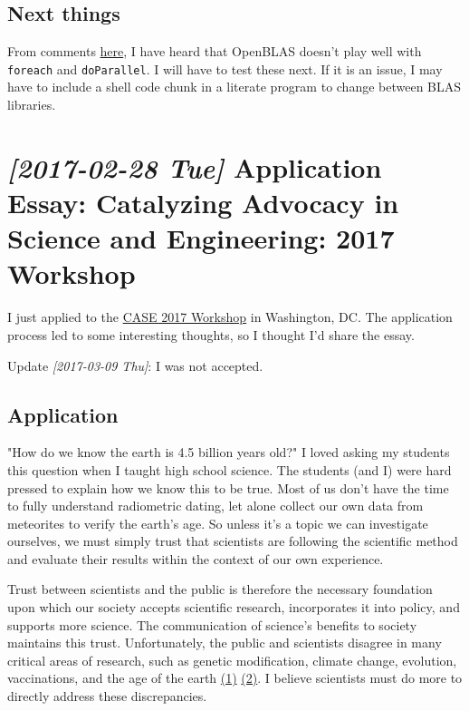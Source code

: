 \documentclass{article}
\begin{document}
\subsection*{Next things}
\label{sec:org8dfe5ce}
From comments \href{http://edustatistics.org/nathanvan/2013/07/09/for-faster-r-use-openblas-instead-better-than-atlas-trivial-to-switch-to-on-ubuntu/}{here}, I have heard that OpenBLAS doesn't play well with
\texttt{foreach} and \texttt{doParallel}.  I will have to test these next.  If it is
an issue, I may have to include a shell code chunk in a literate program
to change between BLAS libraries.

\section*{\textit{[2017-02-28 Tue] } Application Essay: Catalyzing Advocacy in Science and Engineering: 2017 Workshop}
\label{sec:org54913ce}
I just applied to the \href{https://www.aaas.org/page/about-0}{CASE 2017 Workshop} in Washington, DC.  The
application process led to some interesting thoughts, so I thought I'd
share the essay.

Update \textit{[2017-03-09 Thu]}: I was not accepted.

\subsection*{Application}
\label{sec:orgd7dde50}

"How do we know the earth is 4.5 billion years old?"  I loved asking
my students this question when I taught high school science.  The
students (and I) were hard pressed to explain how we know this to be
true. Most of us don't have the time to fully understand radiometric
dating, let alone collect our own data from meteorites to verify the
earth's age. So unless it's a topic we can investigate ourselves, we
must simply trust that scientists are following the scientific method
and evaluate their results within the context of our own experience.

Trust between scientists and the public is therefore the necessary
foundation upon which our society accepts scientific research,
incorporates it into policy, and supports more science. The
communication of science's benefits to society maintains this trust.
Unfortunately, the public and scientists disagree in many critical
areas of research, such as genetic modification, climate change,
evolution, vaccinations, and the age of the earth \href{http://www.pewinternet.org/2015/01/29/public-and-scientists-views-on-science-and-society/}{(1)} \href{http://www.gallup.com/poll/170822/believe-creationist-view-human-origins.aspx?g\_source=SCIENCE\&g\_medium=topic\&g\_campaign=tiles}{(2)}. I believe
scientists must do more to directly address these discrepancies.
\end{document}
